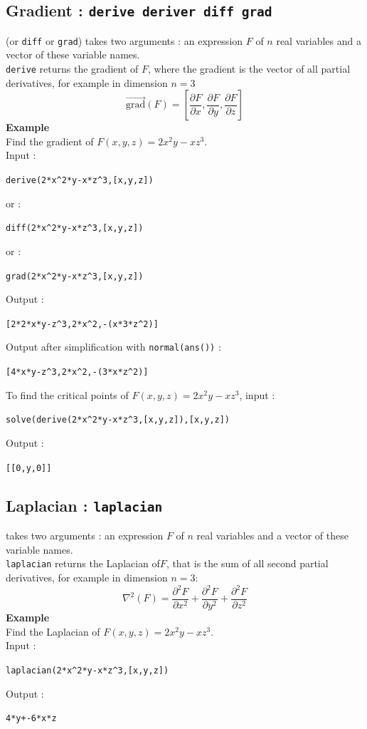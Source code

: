 \documentclass[a4paper,11pt]{book}
\begin{document}
\subsection{Gradient : {\tt derive deriver diff grad}}\label{sec:derive}
 (or {\tt diff} or {\tt grad}) takes two arguments : an 
expression $F$ of $n$ real variables and a vector of these variable names.\\
{\tt derive} returns the gradient of $F$,
where the gradient is the vector of all partial derivatives,
for example in dimension $n=3$
\[ \overrightarrow{\mbox{grad}}(F)= [\frac{\partial F}{\partial x},\frac{\partial F}{\partial y},\frac{\partial F}{\partial z}] \]
{\bf Example} \\
Find the gradient of $F(x,y,z)=2x^2y-xz^3$.\\
Input :
\begin{center}{\tt derive(2*x\verb|^|2*y-x*z\verb|^|3,[x,y,z])}\end{center}
or :
\begin{center}{\tt diff(2*x\verb|^|2*y-x*z\verb|^|3,[x,y,z])}\end{center}
or :
\begin{center}{\tt grad(2*x\verb|^|2*y-x*z\verb|^|3,[x,y,z])}\end{center}
Output :
\begin{center}{\tt [2*2*x*y-z\verb|^|3,2*x\verb|^|2,-(x*3*z\verb|^|2)]}\end{center}
Output after simplification with {\tt normal(ans())} :
\begin{center}{\tt [4*x*y-z\verb|^|3,2*x\verb|^|2,-(3*x*z\verb|^|2)]}\end{center}
To find the critical points of 
$F(x,y,z)=2x^2y-xz^3$, input :
\begin{center}{\tt solve(derive(2*x\verb|^|2*y-x*z\verb|^|3,[x,y,z]),[x,y,z])}\end{center} 
Output :
\begin{center}{\tt [[0,y,0]]}\end{center} 

\subsection{Laplacian : {\tt laplacian}}
 takes two arguments : an 
expression $F$ of $n$ real variables and a vector of these variable names.\\
{\tt laplacian} returns the Laplacian of$F$, that is the sum of all second
partial derivatives, for example in dimension $n=3$:
\[ \nabla^2(F)=\frac{\partial^2 F}{\partial x^2}+\frac{\partial^2 F}{\partial y^2}+\frac{\partial^2 F}{\partial z^2} \]
{\bf Example}\\
Find the Laplacian of $F(x,y,z)=2x^2y-xz^3$.\\
Input :
\begin{center}{\tt laplacian(2*x\verb|^|2*y-x*z\verb|^|3,[x,y,z])}\end{center}
Output :
\begin{center}{\tt 4*y+-6*x*z}\end{center}
\end{document}
